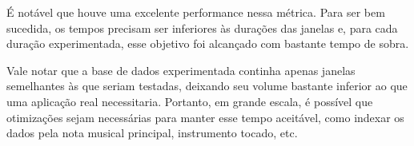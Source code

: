 É notável que houve uma excelente performance nessa métrica. Para ser bem sucedida, os tempos precisam ser inferiores às durações das janelas e, para cada duração experimentada, esse objetivo foi alcançado com bastante tempo de sobra.

Vale notar que a base de dados experimentada continha apenas janelas semelhantes às que seriam testadas, deixando seu volume bastante inferior ao que uma aplicação real necessitaria. Portanto, em grande escala, é possível que otimizações sejam necessárias para manter esse tempo aceitável, como indexar os dados pela nota musical principal, instrumento tocado, etc.